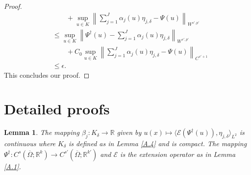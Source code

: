 \documentclass[reqno,9pt]{amsart}
\theoremstyle{plain}
\newtheorem{lem}{Lemma}
\theoremstyle{definition}
\newcommand{\bb}[1]{\mathbb{#1}}
\newcommand{\cal}[1]{\mathcal{#1}}
\begin{document}
\begin{proof}
$$\begin{aligned}
    &\qquad +\sup_{u\in K}\left\|\sum\nolimits_{j=1}^{J}\alpha_j(u)\eta_{j,\delta}-\Psi(u)\right\|_{W^{s',p'}}\\
    &\leq \sup_{u\in K}\left\|\Psi^\dag(u) - \sum\nolimits_{j=1}^{J}\alpha_j(u)\eta_{j,\delta}\right\|_{W^{s',p'}} \\
    & \qquad + C_0\sup_{u\in K}\left\|\sum\nolimits_{j=1}^{J}\alpha_j(u)\eta_{j,\delta} -\Psi(u) \right\|_{C^{s'+1}}\\
    &\leq \epsilon.
\end{aligned}
$$
This concludes our proof.
\end{proof}

\appendix
\section{Detailed proofs} \label{appendix:A}
\begin{lem}
    The mapping $\beta_j : K_\delta \to \bb R$ given by $u(x) \mapsto \langle\cal E(\Psi^\dag(u)),\eta_{j,\delta}\rangle_{L^2}$ is continuous where $K_\delta$ is defined as in Lemma \ref{A.4} and is compact. The mapping $\Psi^\dag : C^s(\overline{\Omega};\bb R^k) \to C^{s'}(\overline{\Omega};\bb R^{k'})$ and $\cal E$ is the extension operator as in Lemma \ref{A.1}.
\end{lem}
\end{document}
